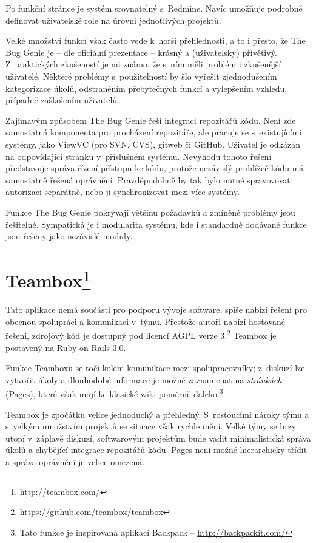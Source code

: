 \documentclass[thesis=B,czech]{FITthesis}[2012/05/02]
\begin{document}
Po funkční stránce je systém srovnatelný s~Redmine. Navíc umožňuje
podrobně definovat uživatelské role na úrovni jednotlivých projektů.

Velké množství funkcí však často vede k~horší přehlednosti, a to i přesto, že
The Bug Genie je -- dle oficiální prezentace -- krásný a
(uživatelsky) přívětivý. Z~praktických zkušeností je mi známo, že s~ním měli problém i
zkušenější uživatelé. Některé problémy s~použitelností by šlo vyřešit
zjednodušením kategorizace úkolů, odstraněním přebytečných funkcí a
vylepšením vzhledu, případně zaškolením uživatelů.

Zajímavým způsobem The Bug Genie řeší integraci repozitářů kódu. 
Není zde samostatná komponenta pro procházení repozitáře, ale pracuje
se s~existujícími systémy, jako ViewVC (pro SVN, CVS), gitweb či GitHub.
Uživatel je odkázán na odpovídající stránku v~příslušném systému.
Nevýhodu tohoto řešení představuje správa řízení přístupu ke kódu, protože
nezávislý prohlížeč kódu má samostatně řešená oprávnění. Pravděpodobně
by tak bylo nutné spravovovat autorizaci separátně, nebo ji
synchronizovat mezi více systémy.

Funkce The Bug Genie pokrývají většinu požadavků a zmíněné problémy jsou
řešitelné. Sympatická je i modularita systému, kde i standardně dodávané
funkce jsou řešeny jako nezávislé moduly.

\section[Teambox]{Teambox\footnote{\url{http://teambox.com/}}}

Tato aplikace nemá součásti pro podporu vývoje software, spíše nabízí
řešení pro obecnou spolupráci a komunikaci v~týmu. Přestože autoři
nabízí hostované řešení, zdrojový kód je dostupný pod licencí \gls{AGPL}
verze 3.\footnote{\url{https://github.com/teambox/teambox}} Teambox je
postavený na Ruby on Rails 3.0.

Funkce Teamboxu se točí kolem komunikace mezi spolupracovníky; z~diskuzí
lze vytvořit úkoly a dlouhodobé informace je možné zaznamenat na
\emph{stránkách} (Pages), které však mají ke klasické wiki poměrně
daleko.\footnote{Tato funkce je inspirovaná aplikací Backpack -- \url{http://backpackit.com/}}

Teambox je zpočátku velice jednoduchý a přehledný.
S~rostoucími nároky týmu a s~velkým množstvím projektů se situace však rychle mění.
Velké týmy se brzy utopí v~záplavě diskuzí, softwarovým projektům
bude vadit minimalistická správa úkolů a chybějící integrace repozitářů
kódu. Pages není možné hierarchicky třídit a správa oprávnění je velice
omezená.
\end{document}
